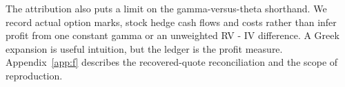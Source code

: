 The attribution also puts a limit on the gamma-versus-theta shorthand. We record actual option marks, stock hedge cash flows and costs rather than infer profit from one constant gamma or an unweighted RV - IV difference. A Greek expansion is useful intuition, but the ledger is the profit measure. Appendix~\ref{app:f} describes the recovered-quote reconciliation and the scope of reproduction.


\FloatBarrier

\FloatBarrier
